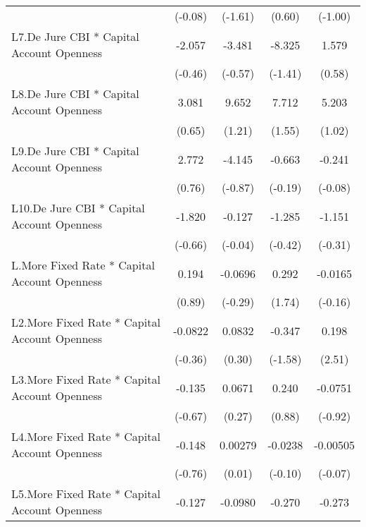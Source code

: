 {\begin{longtable}{l*{4}{c}}
                &  (-0.08)         &  (-1.61)         &   (0.60)         &  (-1.00)         \\
[1em]
L7.De Jure CBI * Capital Account Openness&   -2.057         &   -3.481         &   -8.325         &    1.579         \\
                &  (-0.46)         &  (-0.57)         &  (-1.41)         &   (0.58)         \\
[1em]
L8.De Jure CBI * Capital Account Openness&    3.081         &    9.652         &    7.712         &    5.203         \\
                &   (0.65)         &   (1.21)         &   (1.55)         &   (1.02)         \\
[1em]
L9.De Jure CBI * Capital Account Openness&    2.772         &   -4.145         &   -0.663         &   -0.241         \\
                &   (0.76)         &  (-0.87)         &  (-0.19)         &  (-0.08)         \\
[1em]
L10.De Jure CBI * Capital Account Openness&   -1.820         &   -0.127         &   -1.285         &   -1.151         \\
                &  (-0.66)         &  (-0.04)         &  (-0.42)         &  (-0.31)         \\
[1em]
L.More Fixed Rate * Capital Account Openness&    0.194         &  -0.0696         &    0.292         &  -0.0165         \\
                &   (0.89)         &  (-0.29)         &   (1.74)         &  (-0.16)         \\
[1em]
L2.More Fixed Rate * Capital Account Openness&  -0.0822         &   0.0832         &   -0.347         &    0.198\sym{*}  \\
                &  (-0.36)         &   (0.30)         &  (-1.58)         &   (2.51)         \\
[1em]
L3.More Fixed Rate * Capital Account Openness&   -0.135         &   0.0671         &    0.240         &  -0.0751         \\
                &  (-0.67)         &   (0.27)         &   (0.88)         &  (-0.92)         \\
[1em]
L4.More Fixed Rate * Capital Account Openness&   -0.148         &  0.00279         &  -0.0238         & -0.00505         \\
                &  (-0.76)         &   (0.01)         &  (-0.10)         &  (-0.07)         \\
[1em]
L5.More Fixed Rate * Capital Account Openness&   -0.127         &  -0.0980         &   -0.270         &   -0.273\sym{**} \\

\end{longtable}}
